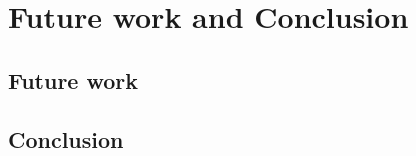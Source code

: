\chapter{Future work and Conclusion\label{chap:conclusion}}

    \section{Future work\label{sec:futurework}}
        
        
        
        
        
    \section{Conclusion\label{sec:conclusion}}
    
